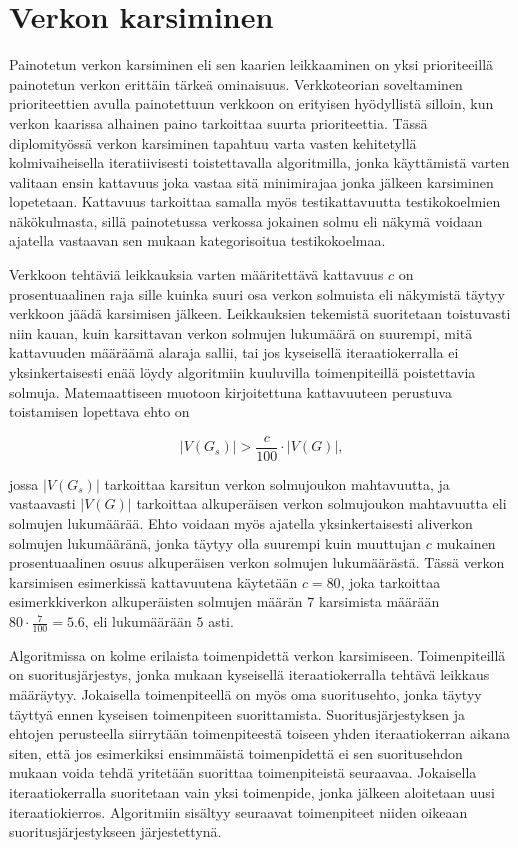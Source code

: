 \section{Verkon karsiminen} \label{ch:10_verkon_karsiminen}

  Painotetun verkon karsiminen eli sen kaarien leikkaaminen on yksi prioriteeillä painotetun verkon erittäin tärkeä ominaisuus.
  Verkkoteorian soveltaminen prioriteettien avulla painotettuun verkkoon on erityisen hyödyllistä silloin, kun verkon kaarissa alhainen paino tarkoittaa suurta prioriteettia.
  Tässä diplomityössä verkon karsiminen tapahtuu varta vasten kehitetyllä kolmivaiheisella iteratiivisesti toistettavalla algoritmilla, jonka käyttämistä varten valitaan ensin kattavuus joka vastaa sitä minimirajaa jonka jälkeen karsiminen lopetetaan.
  Kattavuus tarkoittaa samalla myös testikattavuutta testikokoelmien näkökulmasta, sillä painotetussa verkossa jokainen solmu eli näkymä voidaan ajatella vastaavan sen mukaan kategorisoitua testikokoelmaa.

  Verkkoon tehtäviä leikkauksia varten määritettävä kattavuus \(c\) on prosentuaalinen raja sille kuinka suuri osa verkon solmuista eli näkymistä täytyy verkkoon jäädä karsimisen jälkeen.
  Leikkauksien tekemistä suoritetaan toistuvasti niin kauan, kuin karsittavan verkon solmujen lukumäärä on suurempi, mitä kattavuuden määräämä alaraja sallii, tai jos kyseisellä iteraatiokerralla ei yksinkertaisesti enää löydy algoritmiin kuuluvilla toimenpiteillä poistettavia solmuja.
  Matemaattiseen muotoon kirjoitettuna kattavuuteen perustuva toistamisen lopettava ehto on

  \begin{equation} \label{eq:5_6_1}
    |V(G_s)| >  \frac{c}{100} \cdot |V(G)|
    \text{,}
  \end{equation}

  jossa \(|V(G_s)|\) tarkoittaa karsitun verkon solmujoukon mahtavuutta, ja vastaavasti  \(|V(G)|\) tarkoittaa alkuperäisen verkon solmujoukon mahtavuutta eli solmujen lukumäärää.
  Ehto voidaan myös ajatella yksinkertaisesti aliverkon solmujen lukumääränä, jonka täytyy olla suurempi kuin muuttujan \(c\) mukainen prosentuaalinen osuus alkuperäisen verkon solmujen lukumäärästä.
  Tässä verkon karsimisen esimerkissä kattavuutena käytetään \(c = 80\), joka tarkoittaa esimerkkiverkon alkuperäisten solmujen määrän \(7\) karsimista määrään \(80 \cdot \frac{7}{100} = 5.6\), eli lukumäärään \(5\) asti.

  Algoritmissa on kolme erilaista toimenpidettä verkon karsimiseen.
  Toimenpiteillä on suoritusjärjestys, jonka mukaan kyseisellä iteraatiokerralla tehtävä leikkaus määräytyy.
  Jokaisella toimenpiteellä on myös oma suoritusehto, jonka täytyy täyttyä ennen kyseisen toimenpiteen suorittamista.
  Suoritusjärjestyksen ja ehtojen perusteella siirrytään toimenpiteestä toiseen yhden iteraatiokerran aikana siten, että jos esimerkiksi ensimmäistä toimenpidettä ei sen suoritusehdon mukaan voida tehdä yritetään suorittaa toimenpiteistä seuraavaa.
  Jokaisella iteraatiokerralla suoritetaan vain yksi toimenpide, jonka jälkeen aloitetaan uusi iteraatiokierros.
  Algoritmiin sisältyy seuraavat toimenpiteet niiden oikeaan suoritusjärjestykseen järjestettynä.

